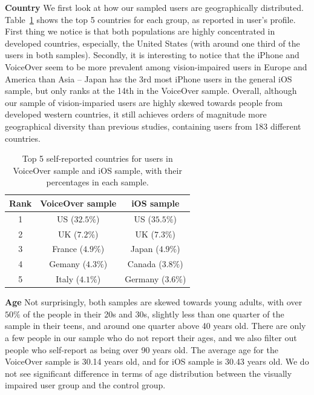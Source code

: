 \documentclass{sigchi}
\newcommand\tabhead[1]{\small\textbf{#1}}
\begin{document}
\textbf{Country} We first look at how our sampled users are geographically distributed. Table~\ref{tab:demographics_country} shows the top 5 countries for each group, as reported in user's profile. First thing we notice is that both populations are highly concentrated in developed countries, especially, the United States (with around one third of the users in both samples). Secondly, it is interesting to notice that the iPhone and VoiceOver seem to be more prevalent among vision-impaired users in Europe and America than Asia -- Japan has the 3rd most iPhone users in the general iOS sample, but only ranks at the 14th in the VoiceOver sample. Overall, although our sample of vision-imparied users are highly skewed towards people from developed western countries, it still achieves orders of magnitude more geographical diversity than previous studies, containing users from 183 different countries.

\begin{table}
  \centering
  \begin{tabular}{|c|c|c|}
    \hline
    \tabhead{Rank} &
      VoiceOver sample & iOS sample \\
    \hline
    1 & US ($32.5\%$) & US ($35.5\%$) \\
    \hline
    2 & UK ($7.2\%$) &  UK ($7.3\%$)\\
    \hline
   3 & France ($4.9\%$) & Japan ($4.9\%$) \\
    \hline 
   4 & Gemany ($4.3\%$) & Canada ($3.8\%$)\\
   \hline
   5 & Italy ($4.1\%$) & Germany ($3.6\%$)\\
   \hline
  \end{tabular}
  \caption{Top 5 self-reported countries for users in VoiceOver sample and iOS sample, with their percentages in each sample. }
  \label{tab:demographics_country}
\end{table}

\textbf{Age}  Not surprisingly, both samples are skewed towards young adults, with over $50\%$ of the people in their 20s and 30s, slightly less than one quarter of the sample in their teens, and around one quarter above 40 years old. There are only a few people in our sample who do not report their ages, and we also filter out people who self-report as being over 90 years old. The average age for the VoiceOver sample is 30.14 years old, and for iOS sample is 30.43 years old. We do not see significant difference in terms of age distribution between the visually impaired user group and the control group.
\end{document}

